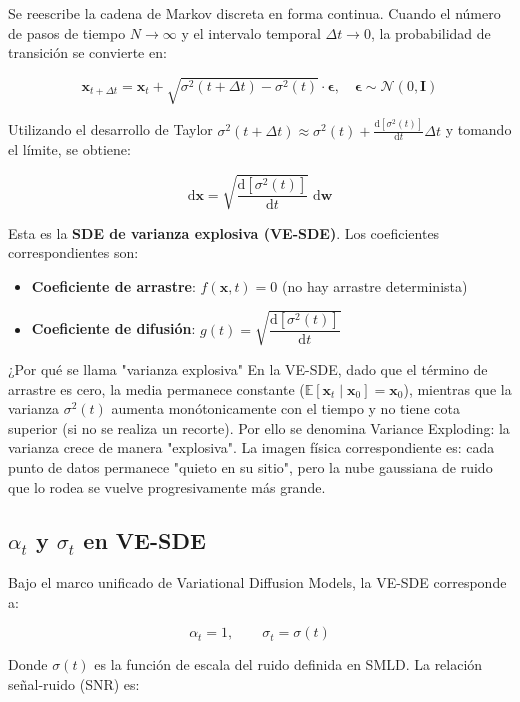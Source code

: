 \documentclass[a4paper]{article}
\begin{document}
Se reescribe la cadena de Markov discreta en forma continua. Cuando el número de pasos de tiempo $N \to \infty$ y el intervalo temporal $\Delta t \to 0$, la probabilidad de transición se convierte en:

$$
\mathbf{x}_{t+\Delta t} = \mathbf{x}_t + \sqrt{\sigma^2(t+\Delta t) - \sigma^2(t)} \cdot \boldsymbol{\epsilon}, \quad \boldsymbol{\epsilon} \sim \mathcal{N}(0, \mathbf{I})
$$

Utilizando el desarrollo de Taylor $\sigma^2(t+\Delta t) \approx \sigma^2(t) + \frac{\mathrm{d}[\sigma^2(t)]}{\mathrm{d}t}\Delta t$ y tomando el límite, se obtiene:

$$
\mathrm{d}\mathbf{x} = \sqrt{\frac{\mathrm{d}[\sigma^2(t)]}{\mathrm{d}t}}\;\mathrm{d}\mathbf{w}
$$

Esta es la \textbf{SDE de varianza explosiva (VE-SDE)}. Los coeficientes correspondientes son:

\begin{itemize}
    \item \textbf{Coeficiente de arrastre}: $f(\mathbf{x}, t) = 0$ (no hay arrastre determinista)
    \item \textbf{Coeficiente de difusión}: $g(t) = \sqrt{\dfrac{\mathrm{d}[\sigma^2(t)]}{\mathrm{d}t}}$
\end{itemize}

\begin{knowledgebox}{¿Por qué se llama "varianza explosiva"}
En la VE-SDE, dado que el término de arrastre es cero, la media permanece constante ($\mathbb{E}[\mathbf{x}_t \mid \mathbf{x}_0] = \mathbf{x}_0$), mientras que la varianza $\sigma^2(t)$ aumenta monótonicamente con el tiempo y no tiene cota superior (si no se realiza un recorte). Por ello se denomina Variance Exploding: la varianza crece de manera "explosiva". La imagen física correspondiente es: cada punto de datos permanece "quieto en su sitio", pero la nube gaussiana de ruido que lo rodea se vuelve progresivamente más grande.
\end{knowledgebox}

\subsection{$\alpha_t$ y $\sigma_t$ en VE-SDE}

Bajo el marco unificado de Variational Diffusion Models, la VE-SDE corresponde a:

$$
\alpha_t = 1, \qquad \sigma_t = \sigma(t)
$$

Donde $\sigma(t)$ es la función de escala del ruido definida en SMLD. La relación señal-ruido (SNR) es:
\end{document}
